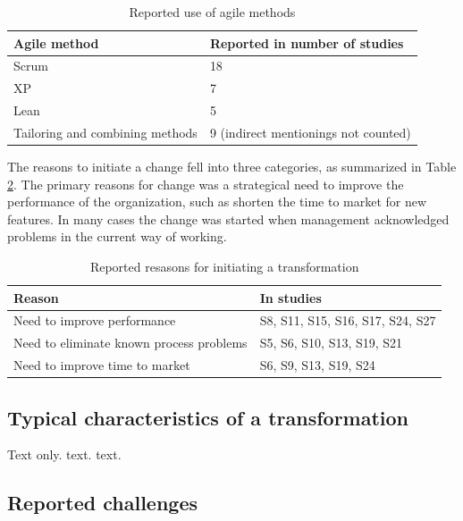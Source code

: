 \documentclass[lnbip]{svmultln}
\begin{document}
\begin{table}[h]
    \begin{tabular}{ l@{ \hskip 0.4cm } l }
        \toprule
        Agile method    & Reported in number of studies   \\ \midrule
        Scrum           & 18 \\ 
        XP              & 7 \\
        Lean            & 5 \\
        Tailoring and combining methods & 9  (indirect mentionings not counted) \\
        \bottomrule
    \end{tabular}
    \caption{Reported use of agile methods}
    \label{table:methods}
\end{table}


The reasons to initiate a change fell into three categories, as summarized in
Table \ref{table:motivations}. The primary reasons for change was a strategical
need to improve the performance of the organization, such as shorten the time to
market for new features. In many cases the change was started when management
acknowledged problems in the current way of working.

\begin{table}[h]
    \begin{tabular}{ l@{ \hskip 0.4cm } l }
        \toprule
        Reason                                    & In studies   \\ \midrule
        Need to improve performance               & S8, S11, S15, S16, S17, S24, S27 \\ 
        Need to eliminate known process problems  & S5, S6, S10, S13, S19, S21 \\
        Need to improve time to market            & S6, S9, S13, S19, S24 \\
        \bottomrule
    \end{tabular}
    \caption{Reported resasons for initiating a transformation}
    \label{table:motivations}
\end{table}


\subsection{Typical characteristics of a transformation}

Text only. text. text.


\subsection{Reported challenges}
\end{document}
